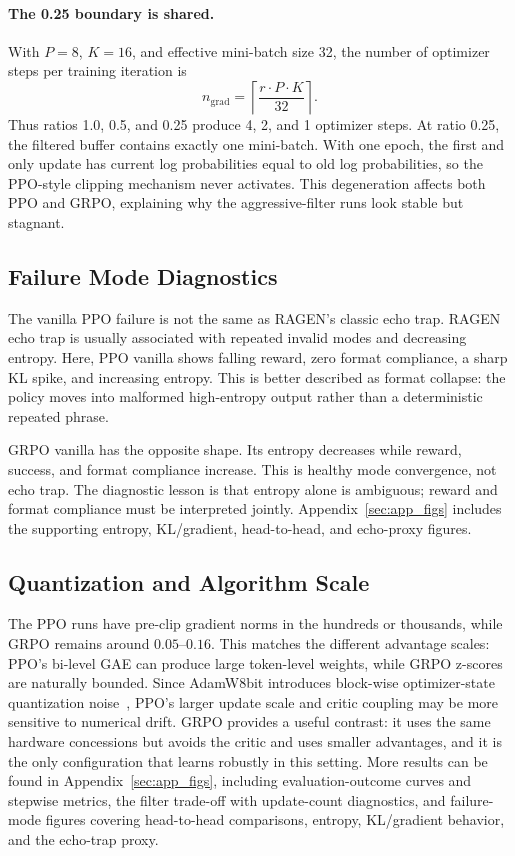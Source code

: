 \paragraph{The 0.25 boundary is shared.}
With \(P=8\), \(K=16\), and effective mini-batch size 32, the number of optimizer steps per training iteration is
\begin{equation}
n_{\mathrm{grad}} =
\left\lceil \frac{r \cdot P \cdot K}{32} \right\rceil.
\end{equation}
Thus ratios 1.0, 0.5, and 0.25 produce 4, 2, and 1 optimizer steps. At ratio 0.25, the filtered buffer contains exactly one mini-batch. With one epoch, the first and only update has current log probabilities equal to old log probabilities, so the PPO-style clipping mechanism never activates. This degeneration affects both PPO and GRPO, explaining why the aggressive-filter runs look stable but stagnant.

\subsection{Failure Mode Diagnostics}

The vanilla PPO failure is not the same as RAGEN's classic echo trap. RAGEN echo trap is usually associated with repeated invalid modes and decreasing entropy. Here, PPO vanilla shows falling reward, zero format compliance, a sharp KL spike, and increasing entropy. This is better described as format collapse: the policy moves into malformed high-entropy output rather than a deterministic repeated phrase.

GRPO vanilla has the opposite shape. Its entropy decreases while reward, success, and format compliance increase. This is healthy mode convergence, not echo trap. The diagnostic lesson is that entropy alone is ambiguous; reward and format compliance must be interpreted jointly. Appendix~\ref{sec:app_figs} includes the supporting entropy, KL/gradient, head-to-head, and echo-proxy figures.

\subsection{Quantization and Algorithm Scale}

The PPO runs have pre-clip gradient norms in the hundreds or thousands, while GRPO remains around \(0.05\)--\(0.16\). This matches the different advantage scales: PPO's bi-level GAE can produce large token-level weights, while GRPO z-scores are naturally bounded. Since AdamW8bit introduces block-wise optimizer-state quantization noise~\citep{dettmers2022optimizers}, PPO's larger update scale and critic coupling may be more sensitive to numerical drift. GRPO provides a useful contrast: it uses the same hardware concessions but avoids the critic and uses smaller advantages, and it is the only configuration that learns robustly in this setting. More results can be found in Appendix~\ref{sec:app_figs}, including evaluation-outcome curves and stepwise metrics, the filter trade-off with update-count diagnostics, and failure-mode figures covering head-to-head comparisons, entropy, KL/gradient behavior, and the echo-trap proxy.